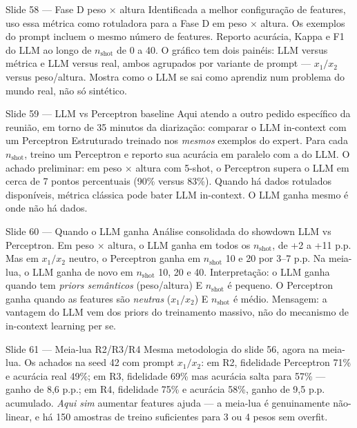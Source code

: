 \documentclass[aspectratio=169,10pt]{beamer}
\begin{document}
\begin{frame}{Slide 58 --- Fase D peso $\times$ altura}
\footnotesize
Identificada a melhor configura\c{c}\~ao de features, uso essa m\'etrica como rotuladora para a Fase D em peso $\times$ altura. Os exemplos do prompt incluem o mesmo n\'umero de features. Reporto acur\'acia, Kappa e F1 do LLM ao longo de $n_{\text{shot}}$ de 0 a 40. O gr\'afico tem dois pain\'eis: LLM versus m\'etrica e LLM versus real, ambos agrupados por variante de prompt --- $x_1/x_2$ versus peso/altura. Mostra como o LLM se sai como aprendiz num problema do mundo real, n\~ao s\'o sint\'etico.
\end{frame}

\begin{frame}{Slide 59 --- LLM vs Perceptron baseline}
\footnotesize
Aqui atendo a outro pedido espec\'ifico da reuni\~ao, em torno de 35 minutos da diariza\c{c}\~ao: comparar o LLM in-context com um Perceptron Estruturado treinado nos \emph{mesmos} exemplos do expert. Para cada $n_{\text{shot}}$, treino um Perceptron e reporto sua acur\'acia em paralelo com a do LLM. O achado preliminar: em peso $\times$ altura com 5-shot, o Perceptron supera o LLM em cerca de 7 pontos percentuais (90\% versus 83\%). Quando h\'a dados rotulados dispon\'iveis, m\'etrica cl\'assica pode bater LLM in-context. O LLM ganha mesmo \'e onde n\~ao h\'a dados.
\end{frame}

\begin{frame}{Slide 60 --- Quando o LLM ganha}
\footnotesize
An\'alise consolidada do showdown LLM vs Perceptron. Em peso $\times$ altura, o LLM ganha em todos os $n_{\text{shot}}$, de +2 a +11 p.p. Mas em $x_1/x_2$ neutro, o Perceptron ganha em $n_{\text{shot}}$ 10 e 20 por 3--7 p.p. Na meia-lua, o LLM ganha de novo em $n_{\text{shot}}$ 10, 20 e 40. Interpreta\c{c}\~ao: o LLM ganha quando tem \emph{priors sem\^anticos} (peso/altura) E $n_{\text{shot}}$ \'e pequeno. O Perceptron ganha quando as features s\~ao \emph{neutras} ($x_1/x_2$) E $n_{\text{shot}}$ \'e m\'edio. Mensagem: a vantagem do LLM vem dos priors do treinamento massivo, n\~ao do mecanismo de in-context learning per se.
\end{frame}

\begin{frame}{Slide 61 --- Meia-lua R2/R3/R4}
\footnotesize
Mesma metodologia do slide 56, agora na meia-lua. Os achados na seed 42 com prompt $x_1/x_2$: em R2, fidelidade Perceptron 71\% e acur\'acia real 49\%; em R3, fidelidade 69\% mas acur\'acia salta para 57\% --- ganho de 8,6 p.p.; em R4, fidelidade 75\% e acur\'acia 58\%, ganho de 9,5 p.p. acumulado. \emph{Aqui sim} aumentar features ajuda --- a meia-lua \'e genuinamente n\~ao-linear, e h\'a 150 amostras de treino suficientes para 3 ou 4 pesos sem overfit.
\end{frame}
\end{document}

